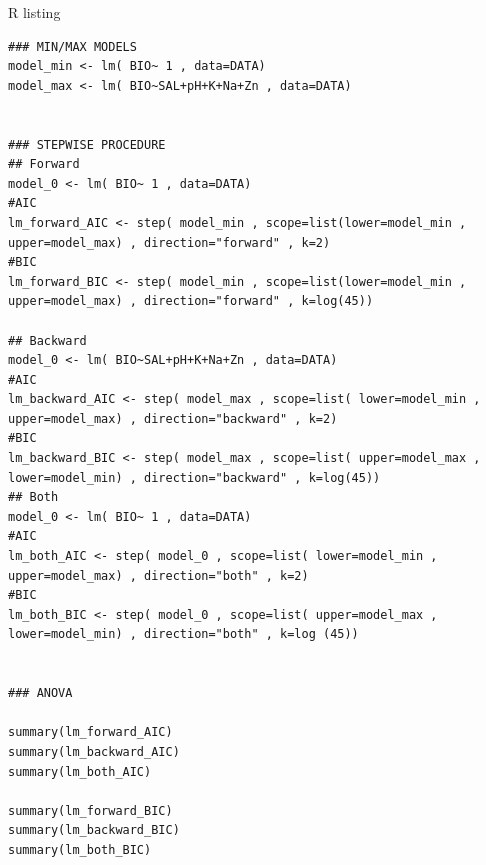R listing
\begin{lstlisting}[style=RStyle,basicstyle=\tiny]
### MIN/MAX MODELS
model_min <- lm( BIO~ 1 , data=DATA)
model_max <- lm( BIO~SAL+pH+K+Na+Zn , data=DATA)


### STEPWISE PROCEDURE
## Forward
model_0 <- lm( BIO~ 1 , data=DATA)
#AIC
lm_forward_AIC <- step( model_min , scope=list(lower=model_min , upper=model_max) , direction="forward" , k=2)
#BIC
lm_forward_BIC <- step( model_min , scope=list(lower=model_min , upper=model_max) , direction="forward" , k=log(45))

## Backward
model_0 <- lm( BIO~SAL+pH+K+Na+Zn , data=DATA)
#AIC
lm_backward_AIC <- step( model_max , scope=list( lower=model_min , upper=model_max) , direction="backward" , k=2)
#BIC
lm_backward_BIC <- step( model_max , scope=list( upper=model_max , lower=model_min) , direction="backward" , k=log(45))
## Both
model_0 <- lm( BIO~ 1 , data=DATA)
#AIC
lm_both_AIC <- step( model_0 , scope=list( lower=model_min , upper=model_max) , direction="both" , k=2)
#BIC
lm_both_BIC <- step( model_0 , scope=list( upper=model_max , lower=model_min) , direction="both" , k=log (45))


### ANOVA

summary(lm_forward_AIC)
summary(lm_backward_AIC)
summary(lm_both_AIC)

summary(lm_forward_BIC)
summary(lm_backward_BIC)
summary(lm_both_BIC)
\end{lstlisting}

